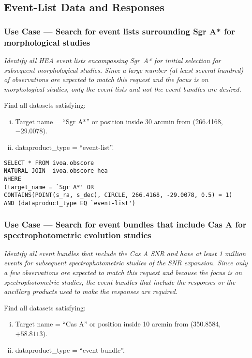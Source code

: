 \subsection{Event-List Data and Responses}


\subsubsection{Use Case --- Search for event lists surrounding Sgr A* for morphological studies}

{\em Identify all HEA event lists encompassing Sgr~A* for initial selection for subsequent morphological studies.  Since a large number (at least several hundred) of observations are expected to match this request and the focus is on morphological studies, only the event lists and not the event bundles are desired.\/}

\medskip
\noindent Find all datasets satisfying:
\begin{enumerate}[(i)]
  \item Target name = ``Sgr A*'' or position inside 30 arcmin from (266.4168, $-29.0078$).
  \item dataproduct\_type = ``event-list''.
\end{enumerate}

\begin{verbatim}
SELECT * FROM ivoa.obscore
NATURAL JOIN  ivoa.obscore-hea 
WHERE
(target_name = `Sgr A*' OR
CONTAINS(POINT(s_ra, s_dec), CIRCLE, 266.4168, -29.0078, 0.5) = 1) 
AND (dataproduct_type EQ `event-list')
\end{verbatim}


\subsubsection{Use Case --- Search for event bundles that include Cas A for spectrophotometric evolution studies}

{\em Identify all event bundles that include the Cas A SNR and have at least 1 million events for subsequent spectrophotometric studies of the SNR expansion.  Since only a few observations are expected to match this request and because the focus is on spectrophotometric studies, the event bundles that include the responses or the ancillary products used to make the responses are required.\/}

\medskip
\noindent Find all datasets satisfying:
\begin{enumerate}[(i)]
  \item Target name = ``Cas A'' or position inside 10 arcmin from (350.8584, $+58.8113$).
  \item dataproduct\_type = ``event-bundle''.
\end{enumerate}

